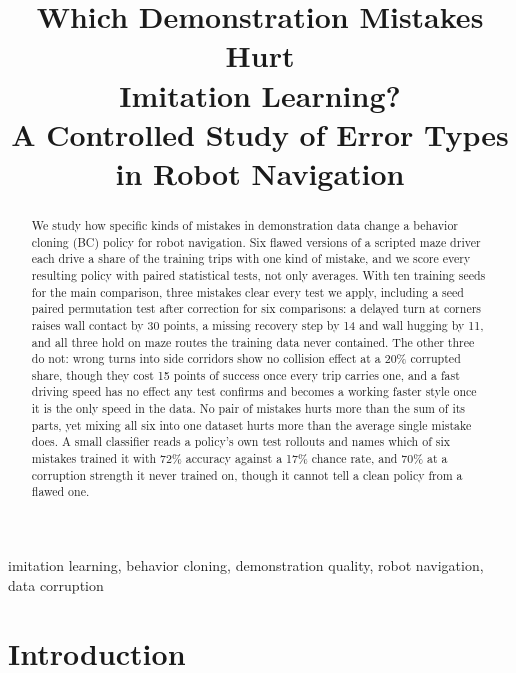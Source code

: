 \documentclass[conference]{IEEEtran}
\begin{document}
\title{Which Demonstration Mistakes Hurt\\Imitation Learning?\\[0.2em]
\large A Controlled Study of Error Types in Robot Navigation}

\author{
}

\maketitle

\begin{abstract}
We study how specific kinds of mistakes in demonstration data change a behavior cloning (BC) policy for robot
navigation. Six flawed versions of a scripted maze driver each drive a share of the training trips with one kind
of mistake, and we score every resulting policy with paired statistical tests, not only averages. With ten
training seeds for the main comparison, three mistakes clear every test we apply, including a seed paired
permutation test after correction for six comparisons: a delayed turn at corners raises wall contact by 30
points, a missing recovery step by 14 and wall hugging by 11, and all three hold on maze routes the training data
never contained. The other three do not: wrong turns into side corridors show no collision effect at a 20\%
corrupted share, though they cost 15 points of success once every trip carries one, and a fast driving speed has no effect
any test confirms and becomes a working faster style once it is the only speed in the data. No pair of mistakes hurts more than the
sum of its parts, yet mixing all six into one dataset hurts more than the average single mistake does. A small
classifier reads a policy's own test rollouts and names which of six mistakes trained it with 72\% accuracy
against a 17\% chance rate, and 70\% at a corruption strength it never trained on, though it cannot tell a clean
policy from a flawed one.
\end{abstract}

\begin{IEEEkeywords}
imitation learning, behavior cloning, demonstration quality, robot navigation, data corruption
\end{IEEEkeywords}

\section{Introduction}
\end{document}
